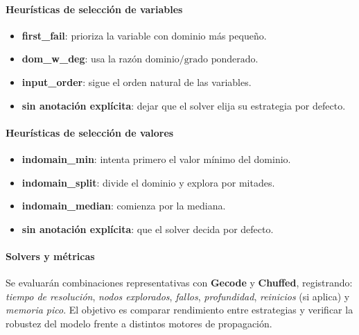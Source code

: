 \paragraph*{Heurísticas de selección de variables}
\begin{itemize}
  \item \textbf{first\_fail}: prioriza la variable con dominio más pequeño.
  \item \textbf{dom\_w\_deg}: usa la razón \(\text{dominio}/\text{grado ponderado}\).
  \item \textbf{input\_order}: sigue el orden natural de las variables.
  \item \textbf{sin anotación explícita}: dejar que el solver elija su estrategia por defecto.
\end{itemize}

\paragraph*{Heurísticas de selección de valores}
\begin{itemize}
  \item \textbf{indomain\_min}: intenta primero el valor mínimo del dominio.
  \item \textbf{indomain\_split}: divide el dominio y explora por mitades.
  \item \textbf{indomain\_median}: comienza por la mediana.
  \item \textbf{sin anotación explícita}: que el solver decida por defecto.
\end{itemize}

\paragraph*{Solvers y métricas}
Se evaluarán combinaciones representativas con \textbf{Gecode} y \textbf{Chuffed}, registrando: \emph{tiempo de resolución}, \emph{nodos explorados}, \emph{fallos}, \emph{profundidad}, \emph{reinicios} (si aplica) y \emph{memoria pico}. El objetivo es comparar rendimiento entre estrategias y verificar la robustez del modelo frente a distintos motores de propagación.
